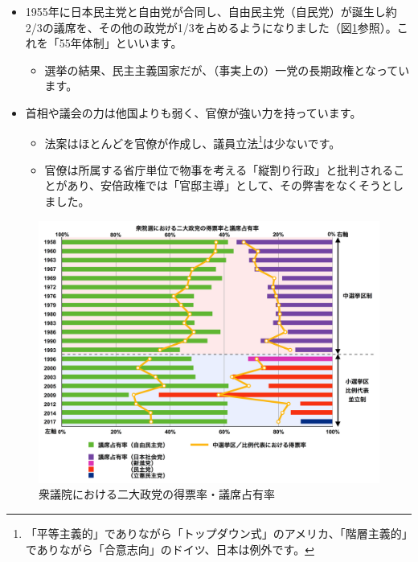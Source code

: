 \documentclass[
]{book}
\providecommand{\tightlist}{%
  \setlength{\itemsep}{0pt}\setlength{\parskip}{0pt}}
\begin{document}
\begin{itemize}
\item
  1955年に日本民主党と自由党が合同し、自由民主党（自民党）が誕生し約2/3の議席を、その他の政党が1/3を占めるようになりました（図\ref{fig:jpparty}参照）。これを「55年体制」といいます。 　

  \begin{itemize}
  \tightlist
  \item
    選挙の結果、民主主義国家だが、（事実上の）一党の長期政権となっています。　
  \end{itemize}
\item
  首相や議会の力は他国よりも弱く、官僚が強い力を持っています。

  \begin{itemize}
  \item
    法案はほとんどを官僚が作成し、議員立法\footnote{「平等主義的」でありながら「トップダウン式」のアメリカ、「階層主義的」でありながら「合意志向」のドイツ、日本は例外です。}は少ないです。
  \item
    官僚は所属する省庁単位で物事を考える「縦割り行政」と批判されることがあり、安倍政権では「官邸主導」として、その弊害をなくそうとしました。
  \end{itemize}
\end{itemize}

\begin{figure}
\includegraphics[width=960px]{Two_Major_Parties_in_House_of_Representatives_of_Japan} \caption{衆議院における二大政党の得票率・議席占有率}\label{fig:jpparty}
\end{figure}
\end{document}
